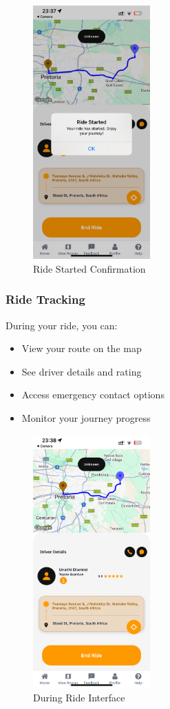 \documentclass[12pt]{article}
\begin{document}
\begin{figure}[H]
  \centering
  \includegraphics[width=0.4\textwidth]{ride_started.png}
  \caption{Ride Started Confirmation}
\end{figure}

\subsubsection{Ride Tracking}
During your ride, you can:
\begin{itemize}
    \item View your route on the map
    \item See driver details and rating
    \item Access emergency contact options
    \item Monitor your journey progress
\end{itemize}

\begin{figure}[H]
  \centering
  \includegraphics[width=0.4\textwidth]{during_ride.png}
  \caption{During Ride Interface}
\end{figure}
\end{document}
